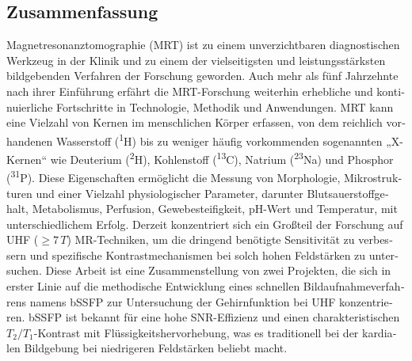 
\begin{otherlanguage}{german}
	\chapter{Zusammenfassung}
	\normalsize 
	Magnetresonanztomographie (MRT) ist zu einem unverzichtbaren diagnostischen Werkzeug in der Klinik und zu einem der vielseitigsten und leistungsstärksten bildgebenden Verfahren der Forschung geworden. Auch mehr als fünf Jahrzehnte nach ihrer Einführung erfährt die MRT-Forschung weiterhin erhebliche und kontinuierliche Fortschritte in Technologie, Methodik und Anwendungen. MRT kann eine Vielzahl von Kernen im menschlichen Körper erfassen, von dem reichlich vorhandenen Wasserstoff (\textsuperscript{1}H) bis zu weniger häufig vorkommenden sogenannten „X-Kernen“ wie Deuterium (\textsuperscript{2}H), Kohlenstoff (\textsuperscript{13}C), Natrium (\textsuperscript{23}Na) und Phosphor (\textsuperscript{31}P). Diese Eigenschaften ermöglicht die Messung von Morphologie, Mikrostrukturen und einer Vielzahl physiologischer Parameter, darunter Blutsauerstoffgehalt, Metabolismus, Perfusion, Gewebesteifigkeit, pH-Wert und Temperatur, mit unterschiedlichem Erfolg. Derzeit konzentriert sich ein Großteil der Forschung auf \gls{UHF} ($\geq 7\,T$) MR-Techniken, um die dringend benötigte Sensitivität zu verbessern und spezifische Kontrastmechanismen bei solch hohen Feldstärken zu untersuchen. Diese Arbeit ist eine Zusammenstellung von zwei Projekten, die sich in erster Linie auf die methodische Entwicklung eines schnellen Bildaufnahmeverfahrens namens \gls{bSSFP} zur Untersuchung der Gehirnfunktion bei \gls{UHF} konzentrieren. \Gls{bSSFP} ist bekannt für eine hohe \gls{SNR}-Effizienz und einen charakteristischen $T_2/T_1$-Kontrast mit Flüssigkeitshervorhebung, was es traditionell bei der kardialen Bildgebung bei niedrigeren Feldstärken beliebt macht. 
	

\end{otherlanguage}
